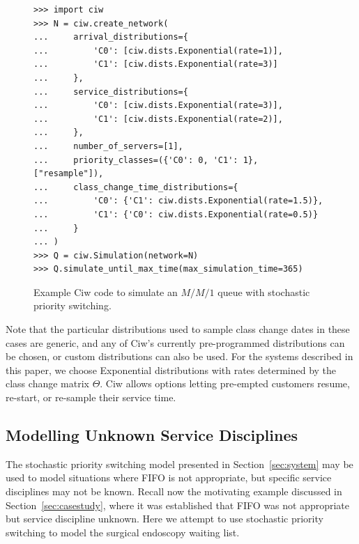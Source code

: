 \documentclass{article}
\begin{document}
\begin{figure}
\begin{verbatim}
>>> import ciw
>>> N = ciw.create_network(
...     arrival_distributions={
...         'C0': [ciw.dists.Exponential(rate=1)],
...         'C1': [ciw.dists.Exponential(rate=3)]
...     },
...     service_distributions={
...         'C0': [ciw.dists.Exponential(rate=3)],
...         'C1': [ciw.dists.Exponential(rate=2)],
...     },
...     number_of_servers=[1],
...     priority_classes=({'C0': 0, 'C1': 1}, ["resample"]),
...     class_change_time_distributions={
...         'C0': {'C1': ciw.dists.Exponential(rate=1.5)},
...         'C1': {'C0': ciw.dists.Exponential(rate=0.5)}
...     }
... )
>>> Q = ciw.Simulation(network=N)
>>> Q.simulate_until_max_time(max_simulation_time=365)
\end{verbatim}
\caption{Example Ciw code to simulate an $M/M/1$ queue with stochastic priority
switching.}
\label{fig:ciwcode}
\end{figure}

Note that the particular distributions used to sample class change dates in
these cases are generic, and any of Ciw's currently pre-programmed distributions
can be chosen, or custom distributions can also be used. For the systems
described in this paper, we choose Exponential distributions with rates
determined by the class change matrix $\Theta$. Ciw allows options letting
pre-empted customers resume, re-start, or re-sample their service time.

\subsection{Modelling Unknown Service Disciplines}\label{sec:modelling}
The stochastic priority switching model presented in Section~\ref{sec:system}
may be used to model situations where FIFO is not appropriate, but specific
service disciplines may not be known. Recall now the motivating example
discussed in Section~\ref{sec:casestudy}, where it was established that FIFO was
not appropriate but service discipline unknown. Here we attempt to use
stochastic priority switching to model the surgical endoscopy waiting list.
\end{document}
